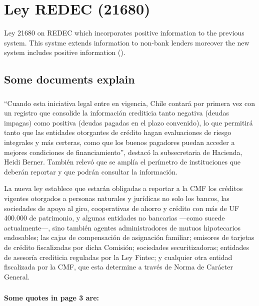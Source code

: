 \documentclass[12pt]{article}
\theoremstyle{plain}
\theoremstyle{plain}
\theoremstyle{definition}  %
\theoremstyle{remark}  %
\begin{document}
  

\section{Ley REDEC (21680)}
Ley 21680 on REDEC which incorporates positive information to the previous system. This systme extends information to non-bank lenders  moreover the new system includes positive information (\cite{marcel_proyecto_2022}). 






\subsection{Some documents explain}


\subsubsection{\textcite{ministerio_de_hacienda_senado_2024}}


“Cuando esta iniciativa legal entre en vigencia, Chile contará por primera vez con un registro que consolide la información crediticia tanto negativa (deudas impagas) como positiva (deudas pagadas en el plazo convenido), lo que permitirá tanto que las entidades otorgantes de crédito hagan evaluaciones de riesgo integrales y más certeras, como que los buenos pagadores puedan acceder a mejores condiciones de financiamiento”, destacó la subsecretaria de Hacienda, Heidi Berner. También relevó que se amplía el perímetro de instituciones que deberán reportar y que podrán consultar la información. 

La nueva ley establece que estarán obligadas a reportar a la CMF los créditos vigentes otorgados a personas naturales y jurídicas no solo los bancos, las sociedades de apoyo al giro, cooperativas de ahorro y crédito con más de UF 400.000 de patrimonio, y algunas entidades no bancarias —como sucede actualmente—, sino también agentes administradores de mutuos hipotecarios endosables; las cajas de compensación de asignación familiar; emisores de tarjetas de crédito fiscalizadas por dicha Comisión; sociedades securitizadoras; entidades de asesoría crediticia reguladas por la Ley Fintec; y cualquier otra entidad fiscalizada por la CMF, que esta determine a través de Norma de Carácter General.










\subsubsection{\textcite{cmf_informe_2025} }
\textbf{Some quotes in page 3 are: }
\end{document}
